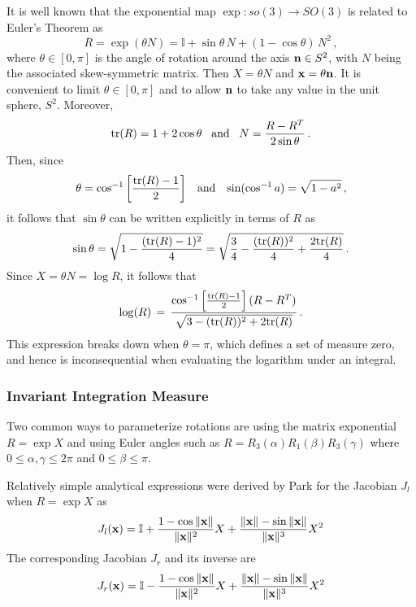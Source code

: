 \documentclass{svmult}
\newcommand{\II}{\mathbb{I}}
\begin{document}
It is well known that the exponential map $\exp: so(3) \rightarrow SO(3)$ is related to Euler's Theorem as
$$ R = \exp(\theta N) = \II + \sin\theta\,N + (1-\cos\theta)\,N^2\,, $$
where $\theta \in [0,\pi]$ is the angle of rotation around the axis ${\bf n} \in S^2$, with $N$
being the associated skew-symmetric matrix. Then $X = \theta N$ and ${\bf x} = \theta {\bf n}$.
It is convenient to limit $\theta \in [0,\pi]$ and to allow ${\bf n}$ to take any value in the unit sphere, $S^2$.
Moreover,
$$ {\rm tr}(R) = 1 + 2 \cos \theta \,\,\,\,\,{\rm and}\,\,\,\,\, N = \frac{R - R^T}{2\sin\theta}\,. $$
Then, since
$$ \theta = \cos^{-1}\left[\frac{{\rm tr}(R)-1}{2}\right] \,\,\,\,\,{\rm and}\,\,\,\,\,\sin(\cos^{-1} a) = \sqrt{1-a^2}\,, $$
it follows that $\sin\theta$ can be written explicitly in terms of $R$ as
$$ \sin\theta = \sqrt{1 - \frac{({\rm tr}(R)-1)^2}{4}} = \sqrt{\frac{3}{4} - \frac{({\rm tr}(R))^2}{4} +
 \frac{2 {\rm tr}(R)}{4}}\,. $$
Since $X = \theta N = \log R$, it follows that
\begin{equation}
\log(R) \,=\, \frac{\cos^{-1}\left[\frac{{\rm tr}(R)-1}{2}\right] (R - R^T)}{
\sqrt{{3} - {({\rm tr}(R))^2} + {2 {\rm tr}(R)}}}\,.
\label{logso3}
\end{equation}
This expression breaks down when $\theta = \pi$, which defines a set of measure zero, and hence is inconsequential when evaluating the logarithm under an integral.

\subsubsection{Invariant Integration Measure}

Two common ways to parameterize rotations are using the matrix exponential $R = \exp X$ and using
Euler angles such as $R = R_3(\alpha) R_1(\beta) R_3(\gamma)$ where $0 \leq \alpha,\gamma \leq 2\pi$
and $0 \leq \beta \leq \pi$.

Relatively simple analytical expressions were derived
by Park \cite{15parkthesis} for
the Jacobian $J_l$ when $R = \exp X$ as
\begin{equation}
J_l({\bf x}) = \II + \frac{1 - \cos \|{\bf x}\|}{\|{\bf x}\|^2}
{X} + \frac{\|{\bf x}\| - \sin \|{\bf x}\|}{\|{\bf x}\|^3} {X}^2
\label{jlx928}
\end{equation}
The corresponding Jacobian $J_r$ and its inverse are \cite{dover,vol2}
$$ J_r({\bf x}) = \II - \frac{1 - \cos \|{\bf x}\|}{\|{\bf x}\|^2}
{X} + \frac{\|{\bf x}\| - \sin \|{\bf x}\|}{\|{\bf x}\|^3} {X}^2 $$
\end{document}
